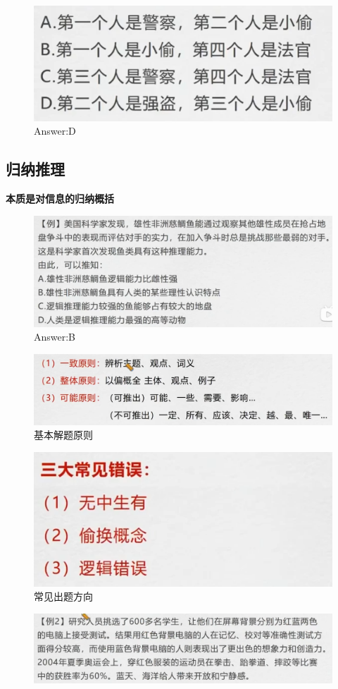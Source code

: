 \documentclass{article}
\numberwithin{equation}{section}						%
\numberwithin{figure}{section}							%
\begin{document}
\begin{sloppypar}
\begin{figure}[H]
     \centering
     \includegraphics[width=0.4\linewidth]{207.png}
		\caption{Answer:D}
\end{figure}


\subsection{归纳推理}

\textbf{本质是对信息的归纳概括}

\begin{figure}[H]
     \centering
     \includegraphics[width=0.65\linewidth]{208.png}
		\caption{Answer:B}
\end{figure}

\begin{figure}[H]
     \centering
     \includegraphics[width=0.55\linewidth]{209.png}
		\caption{基本解题原则}
\end{figure}

\begin{figure}[H]
     \centering
     \includegraphics[width=0.4\linewidth]{210.png}
		\caption{常见出题方向}
\end{figure}

\begin{figure}[H]
     \centering
     \includegraphics[width=0.6\linewidth]{211.png}
\end{figure}


\end{sloppypar}
\end{document}
